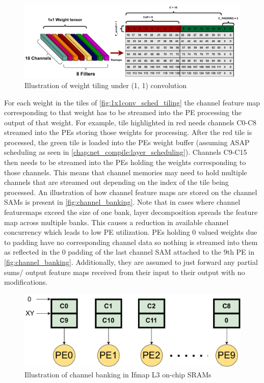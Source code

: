 \begin{figure}[ht]
    \centering
    \includegraphics[scale=0.6]{fig/1x1conv_sched_tiling.pdf}
    \caption{Illustration of weight tiling under (1, 1) convolution}
    \label{fig:1x1conv_sched_tiling}
\end{figure}

For each weight in the tiles of \autoref{fig:1x1conv_sched_tiling} the channel
feature map corresponding to that weight has to be streamed into the PE
processing the output of that weight. For example, tile highlighted in red needs
channels C0-C8 streamed into the PEs storing those weights for processing. After
the red tile is processed, the green tile is loaded into the PEs weight buffer
(assuming ASAP scheduling as seen in
\autoref{chap:net_compile:layer_scheduling}). Channels C9-C15 then needs to be
streamed into the PEs holding the weights corresponding to those channels. This
means that channel memories may need to hold multiple channels that are streamed
out depending on the index of the tile being processed. An illustration of how
channel feature maps are stored on the channel SAMs is present in
\autoref{fig:channel_banking}. Note that in cases where channel featuremaps
exceed the size of one bank, layer decomposition spreads the feature map across
multiple banks. This causes a reduction in available channel concurrency which
leads to low PE utilization. PEs holding 0 valued weights due to padding have no
corresponding channel data so nothing is streamed into them as reflected in the
0 padding of the last channel SAM attached to the 9th PE in
\autoref{fig:channel_banking}. Additionally, they are assumed to just forward
any partial sums/ output feature maps received from their input to their output
with no modifications.

\begin{figure}[ht]
    \centering
    \includegraphics[scale=0.495]{fig/1x1conv_ifmap_banking.pdf}
    \caption{Illustration of channel banking in Ifmap L3 on-chip SRAMs}
    \label{fig:channel_banking}
\end{figure}

